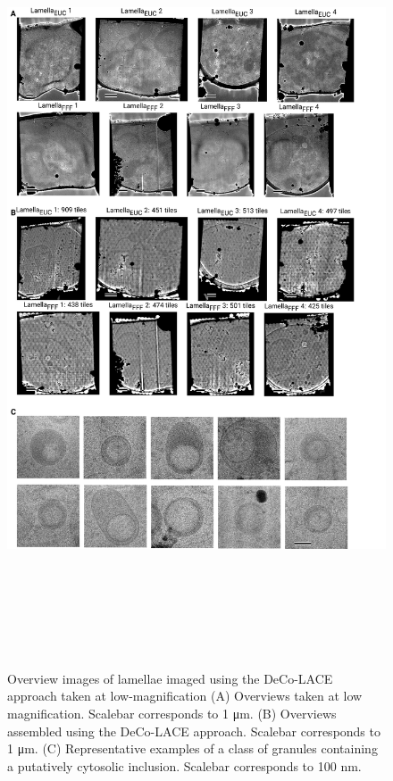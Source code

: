 \documentclass[
]{article}
\newenvironment{fignos:tagged-figure}[1][]{
    \let\oldthefigure\thefigure
    \let\oldtheHfigure\theHfigure
    \renewcommand{\thefigure}{#1}
    \renewcommand{\theHfigure}{#1}
  }{
    \let\thefigure\oldthefigure
    \let\theHfigure\oldtheHfigure
    \addtocounter{figure}{-1}
  }
\begin{document}
\begin{fignos:tagged-figure}

\begin{figure}
\hypertarget{fig:lamella_images}{%
\centering
\includegraphics[width=\textwidth,height=23cm]{figures/lamella_images.png}
\caption{Overview images of lamellae imaged using the DeCo-LACE approach taken at low-magnification (A) Overviews taken at low magnification. Scalebar corresponds to 1 μm. (B) Overviews assembled using the DeCo-LACE approach. Scalebar corresponds to 1 μm. (C) Representative examples of a class of granules containing a putatively cytosolic inclusion. Scalebar corresponds to 100 nm.}\label{fig:lamella_images}
}
\end{figure}

\end{fignos:tagged-figure}
\end{document}
